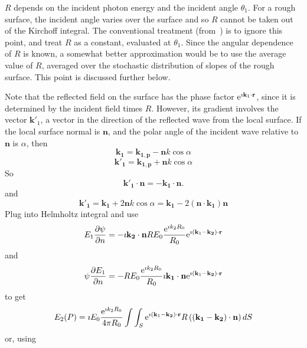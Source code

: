 \documentclass[11pt,openany]{report}
\newcommand{\pder}[2]{\frac{\partial {#1}}{\partial {#2}}}
\newcommand{\e}{{\rm e}}
\newcommand{\bm}[1]{\mathbf{#1}}
\begin{document}
{{$R$ depends on the incident photon energy and the incident angle
$\theta_{1}$. For a rough surface, the incident angle varies over the
surface and so $R$ cannot be taken out of the Kirchoff integral. The
conventional treatment (from~\cite{b:beckmann}) is to ignore this point, and
treat $R$ as a constant, evaluated at $\theta_{1}$.  Since the angular
dependence of $R$ is known, a somewhat better approximation would be
to use the average value of $R$, averaged over the stochastic
distribution of slopes of the rough surface. This point is discussed
further below.

Note that the reflected field on the surface has the phase factor
$\e^{\imath\bm{k}_{1}\cdot\bm{r}}$, since it is determined by the
incident field times $R$. However, its gradient involves the vector
$\bm{k'}_{1}$, a vector in the direction of the reflected wave from
the local surface. If the local surface normal is $\bm n$, and the
polar angle of the incident wave relative to $\bm n$ is $\alpha$, then
  \begin{equation}
\bm {k_{1}}=\bm {k_{1,p}}-\bm{n}k\cos{\alpha}
  \end{equation} 
  \begin{equation}
\bm {k'_{1}}=\bm
{k_{1,p}}+\bm{n}k\cos{\alpha}
  \end{equation} So
  \begin{equation}
\bm{k'_{1}}\cdot\bm{n}=-\bm{k_{1}}\cdot\bm{n}.
  \end{equation}
and 
  \begin{equation}
\bm
{k'_{1}}=\bm {k_{1}}+2\bm{n}k\cos{\alpha}=\bm
{k_{1}}-2(\bm{n}\cdot\bm{k_{1}})\bm{n}
  \end{equation}
Plug into Helmholtz integral  and use
  \begin{equation}
E_{1}\pder{\psi}{n}=-\imath\bm{k_{2}}\cdot\bm{n}RE_{0}
\frac{\e^{\imath k_{2}R_{0}}}{R_{0}}\e^{\imath(\bm{k}_{1}-\bm{k_{2}})\cdot\bm{r}}
  \end{equation}
and
  \begin{equation}
\psi\pder{E_{1}}{n}=-RE_{0}\frac{\e^{\imath k_{2}R_{0}}}{R_{0}}\imath\bm{k_{1}}\cdot\bm{n}
\e^{\imath(\bm{k}_{1}-\bm{k_{2}})\cdot\bm{r}}
  \end{equation}
to get
  \begin{equation}
E_{2}(P)=\imath E_{0}\frac{\e^{\imath k_{2}R_{0}}}
{4\pi R_{0}}\int\int_{S}\e^{\imath(\bm{k}_{1}-\bm{k_{2}})\cdot\bm{r}}R
\left((\bm{k_{1}}-\bm{k_{2}})\cdot\bm{n}\right)dS
  \end{equation}
or, using
  \begin{equation}

\end{equation}}}
\end{document}
